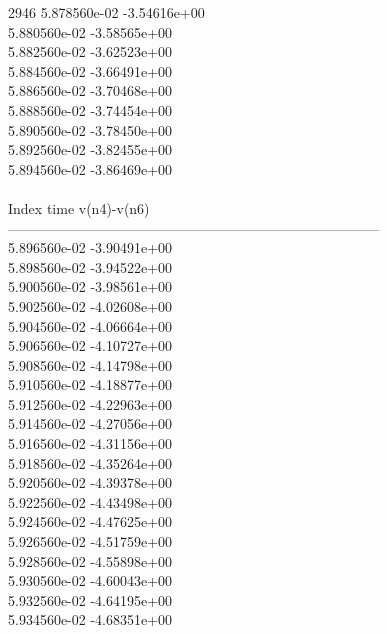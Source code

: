 2946	5.878560e-02	-3.54616e+00	\\ 	5.880560e-02	-3.58565e+00	\\ 	5.882560e-02	-3.62523e+00	\\ 	5.884560e-02	-3.66491e+00	\\ 	5.886560e-02	-3.70468e+00	\\ 	5.888560e-02	-3.74454e+00	\\ 	5.890560e-02	-3.78450e+00	\\ 	5.892560e-02	-3.82455e+00	\\ 	5.894560e-02	-3.86469e+00	\\ \hline
\\ \hline
Index   time            v(n4)-v(n6)     \\ \hline
--------------------------------------------------------------------------------\\ 	5.896560e-02	-3.90491e+00	\\ 	5.898560e-02	-3.94522e+00	\\ 	5.900560e-02	-3.98561e+00	\\ 	5.902560e-02	-4.02608e+00	\\ 	5.904560e-02	-4.06664e+00	\\ 	5.906560e-02	-4.10727e+00	\\ 	5.908560e-02	-4.14798e+00	\\ 	5.910560e-02	-4.18877e+00	\\ 	5.912560e-02	-4.22963e+00	\\ 	5.914560e-02	-4.27056e+00	\\ 	5.916560e-02	-4.31156e+00	\\ 	5.918560e-02	-4.35264e+00	\\ 	5.920560e-02	-4.39378e+00	\\ 	5.922560e-02	-4.43498e+00	\\ 	5.924560e-02	-4.47625e+00	\\ 	5.926560e-02	-4.51759e+00	\\ 	5.928560e-02	-4.55898e+00	\\ 	5.930560e-02	-4.60043e+00	\\ 	5.932560e-02	-4.64195e+00	\\ 	5.934560e-02	-4.68351e+00	\\ \hline

